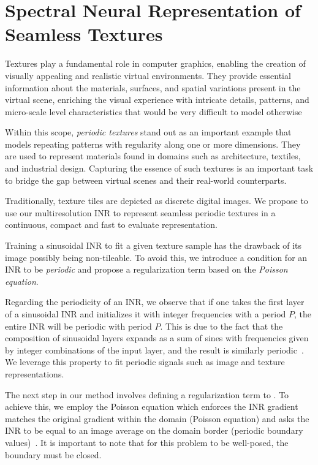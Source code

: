 \section{Spectral Neural Representation of Seamless Textures}

Textures play a fundamental role in computer graphics, enabling the creation of visually appealing and realistic virtual environments. They provide essential information about the materials, surfaces, and spatial variations present in the virtual scene, enriching the visual experience with intricate details, patterns, and micro-scale level characteristics that would be very difficult to model otherwise

Within this scope, \textit{periodic textures} stand out as an important example that models repeating patterns with regularity along one or more dimensions. They are used to represent materials found in domains such as architecture, textiles, and industrial design. Capturing the essence of such textures is an important task to bridge the gap between virtual scenes and their real-world counterparts.


Traditionally, texture tiles are depicted as discrete digital images. We propose to use our multiresolution INR to represent seamless periodic textures in a continuous, compact and fast to evaluate representation. 


Training a sinusoidal INR to fit a given texture sample has the drawback of its image possibly being non-tileable. To avoid this, we introduce a condition for an INR to be \textit{periodic} and propose a regularization term based on the \textit{Poisson equation}. 

Regarding the periodicity of an INR, we observe that if one takes the first layer of a {sinusoidal} INR and initializes it with integer frequencies with a period $P$, the entire INR will be periodic with period $P$. This is due to the fact that the composition of sinusoidal layers expands as a sum of sines with frequencies given by integer combinations of the input layer, and the result is similarly periodic~\cite{novello2022understanding, yuce2022structured}. We leverage this property to fit periodic signals such as image and texture representations.

The next step in our method involves defining a regularization term to .
To achieve this, we employ the Poisson equation which enforces the INR gradient matches the original gradient within the domain (Poisson equation) and asks the INR to be equal to an image average on the domain border (periodic boundary values)~\cite{perez2023poisson}.
It is important to note that for this problem to be well-posed, the boundary must be closed. 

